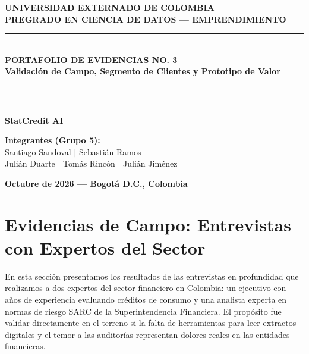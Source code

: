 \documentclass[11pt,a4paper]{article}
\begin{document}
\begin{titlepage}
    \centering
    \vspace*{1cm}
    {\Huge \textbf{UNIVERSIDAD EXTERNADO DE COLOMBIA}}\\[0.4cm]
    {\Large \textbf{PREGRADO EN CIENCIA DE DATOS --- EMPRENDIMIENTO}}\\[1.8cm]
    
    \rule{\linewidth}{0.8mm}\\[0.4cm]
    {\Huge \textbf{PORTAFOLIO DE EVIDENCIAS NO. 3}}\\[0.3cm]
    {\Large \textbf{Validaci\'on de Campo, Segmento de Clientes y Prototipo de Valor}}\\[0.4cm]
    \rule{\linewidth}{0.8mm}\\[1.8cm]
    
    \begin{tcolorbox}[colback=primary!5,colframe=primary]
        \centering \Huge
        \textbf{StatCredit AI}
    \end{tcolorbox}
    
    \vfill
    
    \begin{minipage}{0.8\textwidth}
        \centering
        \textbf{\large Integrantes (Grupo 5):}\\[0.3cm]
        Santiago Sandoval \quad $\vert$ \quad Sebasti\'an Ramos\\[0.15cm]
        Juli\'an Duarte \quad $\vert$ \quad Tom\'as Rinc\'on \quad $\vert$ \quad Juli\'an Jim\'enez
    \end{minipage}
    
    \vfill
    {\large \textbf{Octubre de 2026 --- Bogot\'a D.C., Colombia}}
\end{titlepage}

\newpage
\tableofcontents
\newpage

\section{Evidencias de Campo: Entrevistas con Expertos del Sector}

\begin{tcolorbox}[colback=primary!5,colframe=primary,title={\textbf{\textquestiondown De qu\'e trata este entregable?}}]
En esta secci\'on presentamos los resultados de las entrevistas en profundidad que realizamos a dos expertos del sector financiero en Colombia: un ejecutivo con a\~nos de experiencia evaluando cr\'editos de consumo y una analista experta en normas de riesgo SARC de la Superintendencia Financiera. El prop\'osito fue validar directamente en el terreno si la falta de herramientas para leer extractos digitales y el temor a las auditor\'ias representan dolores reales en las entidades financieras.
\end{tcolorbox}
\end{document}
